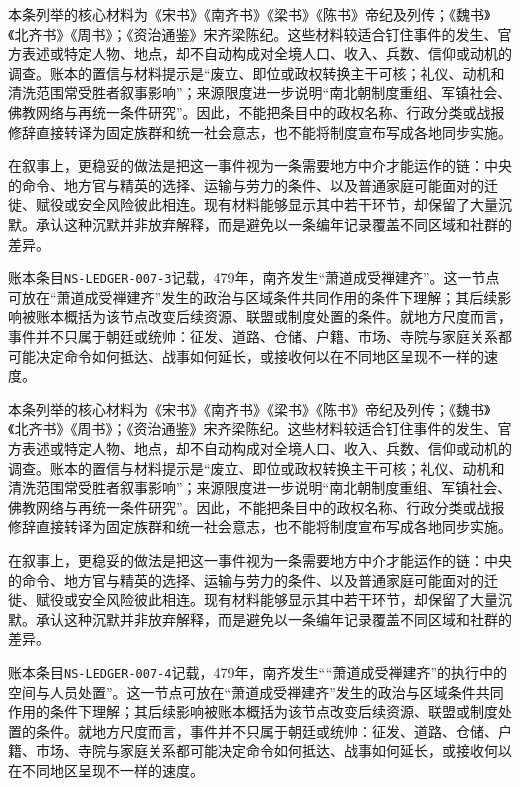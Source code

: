 本条列举的核心材料为《宋书》《南齐书》《梁书》《陈书》帝纪及列传；《魏书》《北齐书》《周书》；《资治通鉴》宋齐梁陈纪。这些材料较适合钉住事件的发生、官方表述或特定人物、地点，却不自动构成对全境人口、收入、兵数、信仰或动机的调查。账本的置信与材料提示是“废立、即位或政权转换主干可核；礼仪、动机和清洗范围常受胜者叙事影响”；来源限度进一步说明“南北朝制度重组、军镇社会、佛教网络与再统一条件研究”。因此，不能把条目中的政权名称、行政分类或战报修辞直接转译为固定族群和统一社会意志，也不能将制度宣布写成各地同步实施。

在叙事上，更稳妥的做法是把这一事件视为一条需要地方中介才能运作的链：中央的命令、地方官与精英的选择、运输与劳力的条件、以及普通家庭可能面对的迁徙、赋役或安全风险彼此相连。现有材料能够显示其中若干环节，却保留了大量沉默。承认这种沉默并非放弃解释，而是避免以一条编年记录覆盖不同区域和社群的差异。

账本条目\texttt{NS-LEDGER-007-3}记载，479年，南齐发生“萧道成受禅建齐”。这一节点可放在“萧道成受禅建齐”发生的政治与区域条件共同作用的条件下理解；其后续影响被账本概括为该节点改变后续资源、联盟或制度处置的条件。就地方尺度而言，事件并不只属于朝廷或统帅：征发、道路、仓储、户籍、市场、寺院与家庭关系都可能决定命令如何抵达、战事如何延长，或接收何以在不同地区呈现不一样的速度。

本条列举的核心材料为《宋书》《南齐书》《梁书》《陈书》帝纪及列传；《魏书》《北齐书》《周书》；《资治通鉴》宋齐梁陈纪。这些材料较适合钉住事件的发生、官方表述或特定人物、地点，却不自动构成对全境人口、收入、兵数、信仰或动机的调查。账本的置信与材料提示是“废立、即位或政权转换主干可核；礼仪、动机和清洗范围常受胜者叙事影响”；来源限度进一步说明“南北朝制度重组、军镇社会、佛教网络与再统一条件研究”。因此，不能把条目中的政权名称、行政分类或战报修辞直接转译为固定族群和统一社会意志，也不能将制度宣布写成各地同步实施。

在叙事上，更稳妥的做法是把这一事件视为一条需要地方中介才能运作的链：中央的命令、地方官与精英的选择、运输与劳力的条件、以及普通家庭可能面对的迁徙、赋役或安全风险彼此相连。现有材料能够显示其中若干环节，却保留了大量沉默。承认这种沉默并非放弃解释，而是避免以一条编年记录覆盖不同区域和社群的差异。

账本条目\texttt{NS-LEDGER-007-4}记载，479年，南齐发生““萧道成受禅建齐”的执行中的空间与人员处置”。这一节点可放在“萧道成受禅建齐”发生的政治与区域条件共同作用的条件下理解；其后续影响被账本概括为该节点改变后续资源、联盟或制度处置的条件。就地方尺度而言，事件并不只属于朝廷或统帅：征发、道路、仓储、户籍、市场、寺院与家庭关系都可能决定命令如何抵达、战事如何延长，或接收何以在不同地区呈现不一样的速度。

